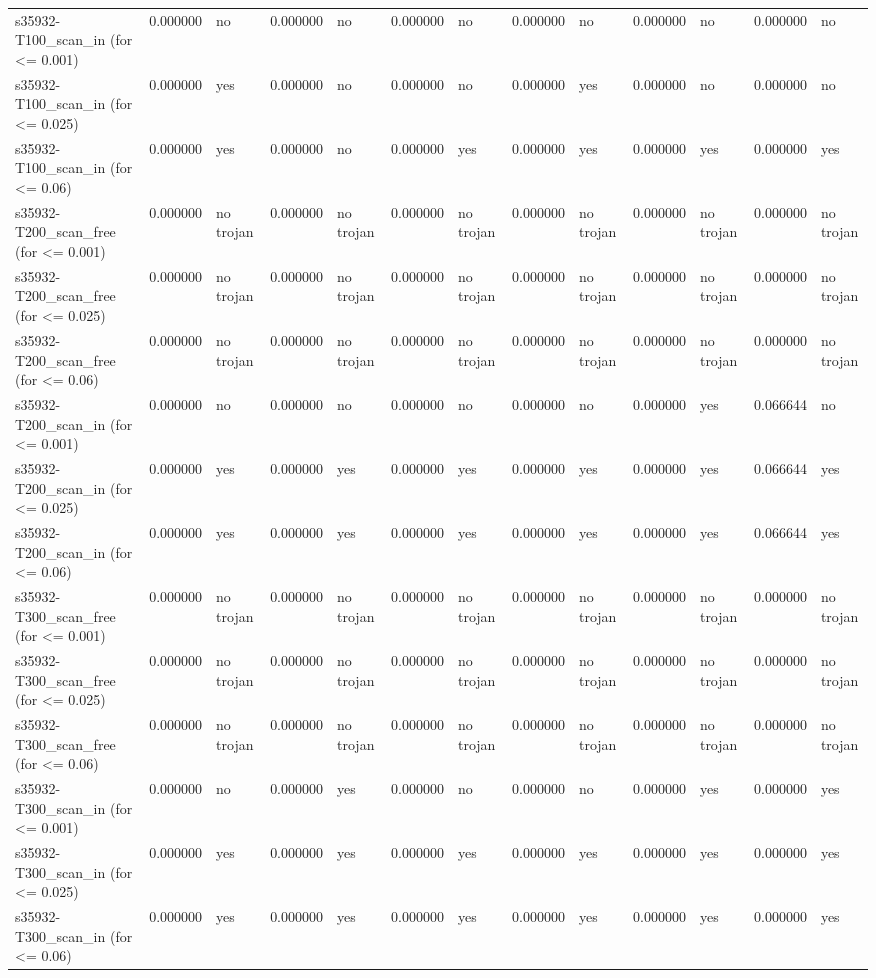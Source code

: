 \begin{tabular}{lrlrlrlrlrlrl}
s35932-T100_scan_in
(for <= 0.001) & 0.000000 & no & 0.000000 & no & 0.000000 & no & 0.000000 & no & 0.000000 & no & 0.000000 & no \\
s35932-T100_scan_in
(for <= 0.025) & 0.000000 & yes & 0.000000 & no & 0.000000 & no & 0.000000 & yes & 0.000000 & no & 0.000000 & no \\
s35932-T100_scan_in
(for <= 0.06) & 0.000000 & yes & 0.000000 & no & 0.000000 & yes & 0.000000 & yes & 0.000000 & yes & 0.000000 & yes \\
s35932-T200_scan_free
(for <= 0.001) & 0.000000 & no trojan & 0.000000 & no trojan & 0.000000 & no trojan & 0.000000 & no trojan & 0.000000 & no trojan & 0.000000 & no trojan \\
s35932-T200_scan_free
(for <= 0.025) & 0.000000 & no trojan & 0.000000 & no trojan & 0.000000 & no trojan & 0.000000 & no trojan & 0.000000 & no trojan & 0.000000 & no trojan \\
s35932-T200_scan_free
(for <= 0.06) & 0.000000 & no trojan & 0.000000 & no trojan & 0.000000 & no trojan & 0.000000 & no trojan & 0.000000 & no trojan & 0.000000 & no trojan \\
s35932-T200_scan_in
(for <= 0.001) & 0.000000 & no & 0.000000 & no & 0.000000 & no & 0.000000 & no & 0.000000 & yes & 0.066644 & no \\
s35932-T200_scan_in
(for <= 0.025) & 0.000000 & yes & 0.000000 & yes & 0.000000 & yes & 0.000000 & yes & 0.000000 & yes & 0.066644 & yes \\
s35932-T200_scan_in
(for <= 0.06) & 0.000000 & yes & 0.000000 & yes & 0.000000 & yes & 0.000000 & yes & 0.000000 & yes & 0.066644 & yes \\
s35932-T300_scan_free
(for <= 0.001) & 0.000000 & no trojan & 0.000000 & no trojan & 0.000000 & no trojan & 0.000000 & no trojan & 0.000000 & no trojan & 0.000000 & no trojan \\
s35932-T300_scan_free
(for <= 0.025) & 0.000000 & no trojan & 0.000000 & no trojan & 0.000000 & no trojan & 0.000000 & no trojan & 0.000000 & no trojan & 0.000000 & no trojan \\
s35932-T300_scan_free
(for <= 0.06) & 0.000000 & no trojan & 0.000000 & no trojan & 0.000000 & no trojan & 0.000000 & no trojan & 0.000000 & no trojan & 0.000000 & no trojan \\
s35932-T300_scan_in
(for <= 0.001) & 0.000000 & no & 0.000000 & yes & 0.000000 & no & 0.000000 & no & 0.000000 & yes & 0.000000 & yes \\
s35932-T300_scan_in
(for <= 0.025) & 0.000000 & yes & 0.000000 & yes & 0.000000 & yes & 0.000000 & yes & 0.000000 & yes & 0.000000 & yes \\
s35932-T300_scan_in
(for <= 0.06) & 0.000000 & yes & 0.000000 & yes & 0.000000 & yes & 0.000000 & yes & 0.000000 & yes & 0.000000 & yes \\
\bottomrule
\end{tabular}
